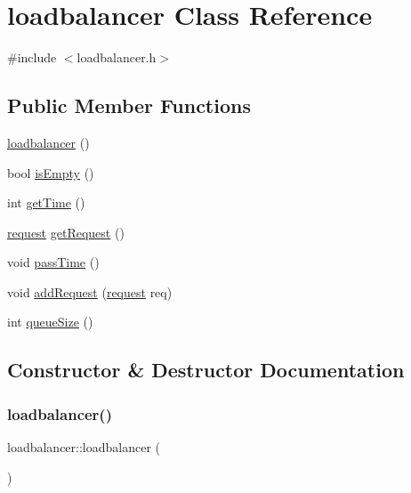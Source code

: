 \hypertarget{classloadbalancer}{}\section{loadbalancer Class Reference}
\label{classloadbalancer}


{\ttfamily \#include $<$loadbalancer.\+h$>$}

\subsection*{Public Member Functions}
\begin{DoxyCompactItemize}
\item 
\hyperlink{classloadbalancer_ad453fd2fc0c910f82ef31c18353fc774}{loadbalancer} ()
\item 
bool \hyperlink{classloadbalancer_a542b0b5b5759c074e3e8d1cbf1f33b52}{is\+Empty} ()
\item 
int \hyperlink{classloadbalancer_afc308893c7ab0fc8b92036deae7a2de9}{get\+Time} ()
\item 
\hyperlink{structrequest}{request} \hyperlink{classloadbalancer_a3d1715e4b2218a7aa9ad74e3e4fa6167}{get\+Request} ()
\item 
void \hyperlink{classloadbalancer_a4d793bdf97c72b577ada58a774c3bddb}{pass\+Time} ()
\item 
void \hyperlink{classloadbalancer_a2c45d009dffc50f5d5d3a6c2b295311d}{add\+Request} (\hyperlink{structrequest}{request} req)
\item 
int \hyperlink{classloadbalancer_a9716bb001708f3c7792df0d1c8689ab0}{queue\+Size} ()
\end{DoxyCompactItemize}


\subsection{Constructor \& Destructor Documentation}
\mbox{\label{classloadbalancer_ad453fd2fc0c910f82ef31c18353fc774}} 
\subsubsection{\texorpdfstring{loadbalancer()}{loadbalancer()}}
{\footnotesize\ttfamily loadbalancer\+::loadbalancer (\begin{DoxyParamCaption}{ }\end{DoxyParamCaption})}

